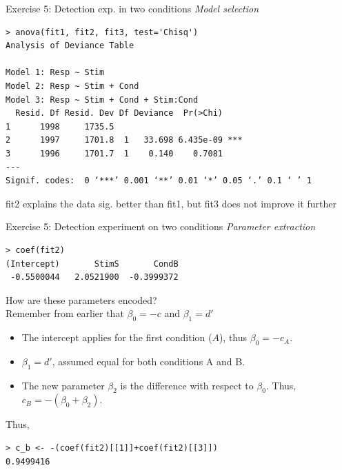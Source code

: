 \documentclass[10pt]{beamer}
\begin{document}
\begin{frame}[fragile]{Exercise 5: Detection exp. in two conditions}
\textit{Model selection}

\begin{verbatim}
> anova(fit1, fit2, fit3, test='Chisq')
Analysis of Deviance Table

Model 1: Resp ~ Stim
Model 2: Resp ~ Stim + Cond
Model 3: Resp ~ Stim + Cond + Stim:Cond
  Resid. Df Resid. Dev Df Deviance  Pr(>Chi)    
1      1998     1735.5                          
2      1997     1701.8  1   33.698 6.435e-09 ***
3      1996     1701.7  1    0.140    0.7081    
---
Signif. codes:  0 ‘***’ 0.001 ‘**’ 0.01 ‘*’ 0.05 ‘.’ 0.1 ‘ ’ 1
\end{verbatim}



\alert{fit2 explains the data sig. better than fit1, but fit3 does not improve it further}
\end{frame}

\begin{frame}[fragile]{Exercise 5: Detection experiment on two conditions}
\textit{Parameter extraction}
\begin{verbatim}
> coef(fit2)
(Intercept)       StimS       CondB 
 -0.5500044   2.0521900  -0.3999372 
\end{verbatim}

How are these parameters encoded?\\[10pt]
\pause
Remember from earlier that $\beta_0 = -c$ and $\beta_1 = d'$\\[5pt]

\begin{itemize}
\item The intercept applies for the first condition ($A$), thus
$\beta_0 = -c_A$.
\item $\beta_1 = d'$, assumed equal for both conditions A and B.
\item The new parameter $\beta_2$ is the difference with respect to $\beta_0$. Thus, $c_B = - (\beta_0 + \beta_2)$.
\end{itemize}

Thus,
\begin{verbatim}
> c_b <- -(coef(fit2)[[1]]+coef(fit2)[[3]])
0.9499416
\end{verbatim}
\end{frame}



\end{document}

